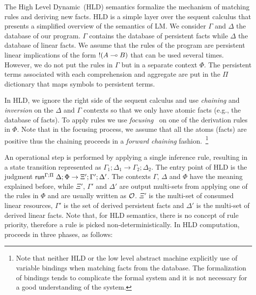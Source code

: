 The High Level Dynamic~(HLD) semantics formalize the mechanism of matching rules
and deriving new facts. HLD is a simple layer over the sequent calculus that
presents a simplified overview of the semantics of LM. We consider $\Gamma$ and
$\Delta$ the database of our program. $\Gamma$ contains the database of
persistent facts while $\Delta$ the database of linear facts. We assume that the
rules of the program are persistent linear implications of the form ${!} (A
\multimap B)$ that can be used several times. However, we do not put the rules in
$\Gamma$ but in a separate context $\Phi$. The persistent terms associated with
each comprehension and aggregate are put in the $\Pi$ dictionary that maps
symbols to persistent terms.

In HLD, we ignore the right side of the sequent calculus and use \emph{chaining}
and \emph{inversion} on the $\Delta$ and $\Gamma$ contexts so that we only have
atomic facts (e.g., the database of facts). To apply rules we use
\emph{focusing}~\cite{Andreoli92logicprogramming} on one of the derivation rules
in $\Phi$. Note that in the focusing process, we assume that all the atoms
(facts) are positive thus the chaining proceeds in a \emph{forward chaining}
fashion.~\footnote{Note that neither HLD or the low level abstract machine
   explicitly use of variable bindings when matching facts from the database. The
   formalization of bindings tends to complicate the formal system and it is not
   necessary for a good understanding of the system.}

An operational step is performed by applying a single inference rule, resulting
in a state transition represented as $\Gamma_1; \Delta_1 \rightarrow \Gamma_2;
\Delta_2$. The entry point of HLD is the judgment
$\mathsf{run}^{\Gamma ; \Pi} \; \Delta ; \Phi \rightarrow \Xi' ; \Gamma'; \Delta'$. The contexts
$\Gamma$, $\Delta$ and $\Phi$ have the meaning explained before, while $\Xi'$,
$\Gamma'$ and $\Delta'$ are output multi-sets from applying one of the rules in
$\Phi$ and are usually written as $\mathcal{O}$. $\Xi'$ is the multi-set of consumed
linear resources, $\Gamma'$ is the set of derived persistent facts and $\Delta'$
is the multi-set of derived linear facts. Note that, for HLD semantics, there is
no concept of rule priority, therefore a rule is picked non-deterministically.
In HLD computation, proceeds in three phases, as follows:

